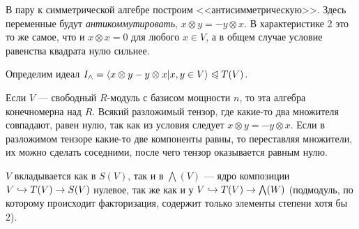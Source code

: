 В пару к симметрической алгебре построим <<антисимметрическую>>.
Здесь переменные будут \emph{антикоммутировать}, $x \otimes y = -y \otimes x$.
В характеристике 2 это то же самое, что и $x \otimes x = 0$ для любого $x \in V$, а в общем случае условие равенства квадрата нулю сильнее.

Определим идеал $I_{\wedge} = \left\langle x \otimes y - y \otimes x \middle| x, y \in V\right\rangle \trianglelefteqslant T(V)$.

Если $V$ --- свободный $R$-модуль с базисом мощности $n$, то эта алгебра конечномерна над $R$.
Всякий разложимый тензор, где какие-то два множителя совпадают, равен нулю, так как из условия следует $x \otimes y = -y \otimes x$.
Если в разложимом тензоре какие-то две компоненты равны, то переставляя множители, их можно сделать соседними, после чего тензор оказывается равным нулю.

$V$ вкладывается как в $S(V)$, так и в $\bigwedge(V)$ --- ядро композиции $V \hookrightarrow T(V) \rightarrow S(V)$ нулевое, так же как и у $V \hookrightarrow T(V) \rightarrow \bigwedge(W)$ (подмодуль, по которому происходит факторизация, содержит только элементы степени хотя бы 2).

